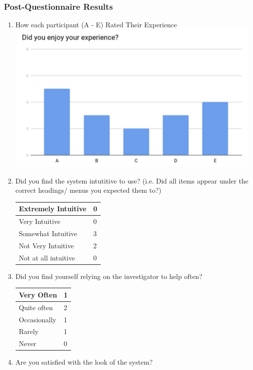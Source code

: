 \documentclass[11pt, a4paper]{report}
\begin{document}
\subsubsection{Post-Questionnaire Results} 
\begin{enumerate} 
\item How each participant (A - E) Rated Their Experience \\ \includegraphics[scale = 0.5]{Figures/PQ1.png} 
\item Did you find the system intutitive to use? (i.e. Did all items appear under the correct headings/ menus you expected them to?) \\ 
\begin{tabulary}{\textwidth}{| L l |}
\toprule
Extremely Intuitive & 0 \\ \midrule
Very Intuitive & 0 \\ \midrule
Somewhat Intuitive & 3 \\ \midrule
Not Very Intuitive & 2 \\ \midrule
Not at all intuitive & 0 \\ \bottomrule
\end{tabulary}
\item Did you find yourself relying on the investigator to help often? \\
\begin{tabulary}{\textwidth}{| L l |}
\toprule
Very Often & 1 \\ \midrule
Quite often & 2 \\ \midrule
Occasionally  & 1 \\ \midrule
Rarely & 1 \\ \midrule
Never & 0 \\ \bottomrule
\end{tabulary}
\item Are you satisfied with the look of the system? \\

\end{enumerate}
\end{document}
